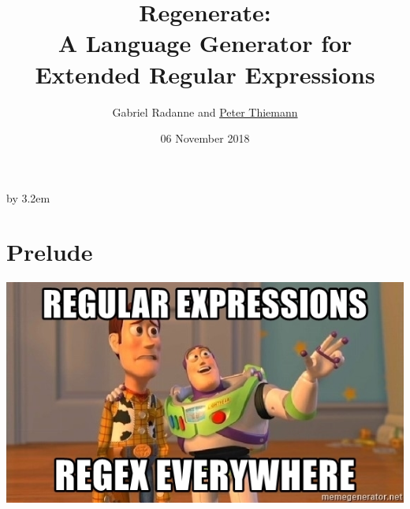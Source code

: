 \documentclass[pdftex,aspectratio=169]{beamer}
\begin{document}
\everymath{\displaystyle}


\title[Regenerate]{{\Huge\bf Regenerate:} \\
  A Language Generator for Extended Regular Expressions}
\author[Thiemann]%
{Gabriel Radanne and \underline{Peter Thiemann}}
\date[2018-11-06]{06 November 2018}

\makeatletter
\begin{frame}[plain,label=fp]
    \advance\textwidth by 3.2em\relax
    \begin{minipage}{\textwidth}\par%
      \maketitle
    \end{minipage}
    \hspace*{2.5em}%
\end{frame}
\makeatother 

\section{Prelude}

\begin{frame}
    \begin{center}
      \includegraphics[scale=0.8]{regular-expressions-regex-everywhere}
    \end{center}
\end{frame}
\end{document}
